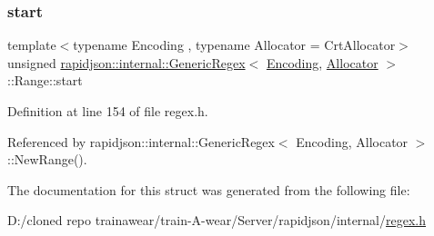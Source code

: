 \subsubsection{\texorpdfstring{start}{start}}
{\footnotesize\ttfamily template$<$typename Encoding , typename Allocator  = Crt\+Allocator$>$ \\
unsigned \mbox{\hyperlink{classrapidjson_1_1internal_1_1_generic_regex}{rapidjson\+::internal\+::\+Generic\+Regex}}$<$ \mbox{\hyperlink{classrapidjson_1_1_encoding}{Encoding}}, \mbox{\hyperlink{classrapidjson_1_1_allocator}{Allocator}} $>$\+::Range\+::start}



Definition at line 154 of file regex.\+h.



Referenced by rapidjson\+::internal\+::\+Generic\+Regex$<$ Encoding, Allocator $>$\+::\+New\+Range().



The documentation for this struct was generated from the following file\+:\begin{DoxyCompactItemize}
\item 
D\+:/cloned repo trainawear/train-\/\+A-\/wear/\+Server/rapidjson/internal/\mbox{\hyperlink{regex_8h}{regex.\+h}}\end{DoxyCompactItemize}
